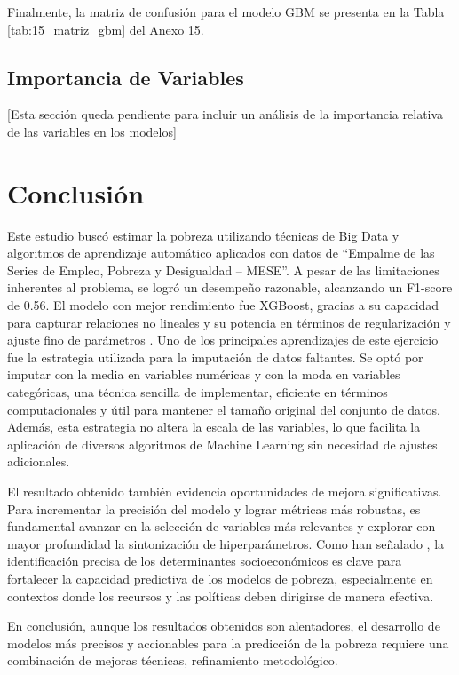 \documentclass[12pt,a4paper,onecolumn]{article}
\begin{document}
Finalmente, la matriz de confusión para el modelo GBM se presenta en la Tabla \ref{tab:15_matriz_gbm} del Anexo 15.

\subsection{Importancia de Variables}

[Esta sección queda pendiente para incluir un análisis de la importancia relativa de las variables en los modelos]

\section{Conclusión}

Este estudio buscó estimar la pobreza utilizando técnicas de Big Data y algoritmos de aprendizaje automático aplicados con datos de “Empalme de las Series de Empleo, Pobreza y Desigualdad – MESE”. A pesar de las limitaciones inherentes al problema, se logró un desempeño razonable, alcanzando un F1-score de 0.56. El modelo con mejor rendimiento fue XGBoost, gracias a su capacidad para capturar relaciones no lineales y su potencia en términos de regularización y ajuste fino de parámetros \cite{huang2025unveiling}.
Uno de los principales aprendizajes de este ejercicio fue la estrategia utilizada para la imputación de datos faltantes. Se optó por imputar con la media en variables numéricas y con la moda en variables categóricas, una técnica sencilla de implementar, eficiente en términos computacionales y útil para mantener el tamaño original del conjunto de datos. Además, esta estrategia no altera la escala de las variables, lo que facilita la aplicación de diversos algoritmos de Machine Learning sin necesidad de ajustes adicionales.

El resultado obtenido también evidencia oportunidades de mejora significativas. Para incrementar la precisión del modelo y lograr métricas más robustas, es fundamental avanzar en la selección de variables más relevantes y explorar con mayor profundidad la sintonización de hiperparámetros. Como han señalado \cite{karmaker2025machine}, la identificación precisa de los determinantes socioeconómicos es clave para fortalecer la capacidad predictiva de los modelos de pobreza, especialmente en contextos donde los recursos y las políticas deben dirigirse de manera efectiva.

En conclusión, aunque los resultados obtenidos son alentadores, el desarrollo de modelos más precisos y accionables para la predicción de la pobreza requiere una combinación de mejoras técnicas, refinamiento metodológico.
\end{document}
